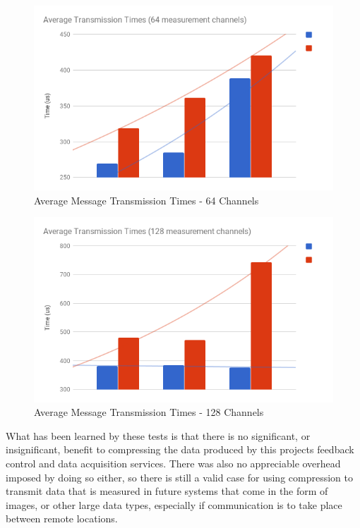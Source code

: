       \begin{figure}[H]
        \includegraphics[width=\textwidth]{figures/testing/compression/64mps-avg-msg-time}
        \caption{Average Message Transmission Times - 64 Channels}
        \label{fig:zlib-tests-time-64}
      \end{figure}

      \begin{figure}[H]
        \includegraphics[width=\textwidth]{figures/testing/compression/128mps-avg-msg-time}
        \caption{Average Message Transmission Times - 128 Channels}
        \label{fig:zlib-tests-time-128}
      \end{figure}

      What has been learned by these tests is that there is no significant, or
      insignificant, benefit to compressing the data produced by this projects
      feedback control and data acquisition services.  There was also no
      appreciable overhead imposed by doing so either, so there is still a
      valid case for using compression to transmit data that is measured in
      future systems that come in the form of images, or other large data
      types, especially if communication is to take place between remote
      locations.

